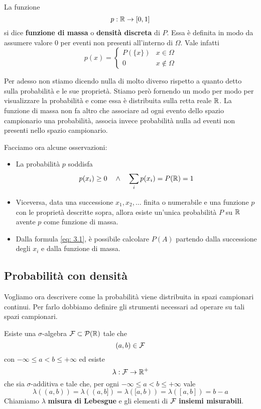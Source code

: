 \begin{definition}
	La funzione
	\[ p : \mathbb{R} \to [0,1] \]
	si dice \textbf{funzione di massa} o \textbf{densità discreta} di $P$. Essa è definita in modo
	da assumere valore 0 per eventi non presenti all'interno di $\Omega$. Vale infatti
	\[
		p(x) = \begin{cases}
			P(\{ x \}) & x \in \Omega    \\[1ex]
			0          & x \notin \Omega
		\end{cases}
	\]
\end{definition}

Per adesso non stiamo dicendo nulla di molto diverso rispetto a quanto detto sulla probabilità e
le sue proprietà. Stiamo però fornendo un modo per modo per visualizzare la probabilità e come
essa è distribuita sulla retta reale $\mathbb{R}$. La funzione di massa non fa altro che associare ad
ogni evento dello spazio campionario una probabilità, associa invece probabilità nulla ad eventi
non presenti nello spazio campionario.

\begin{observation}
	Facciamo ora alcune osservazioni:
	\begin{itemize}
		\item La probabilità $p$ soddisfa
		      \[ p(x_i) \geq 0 \quad \land \quad \sum_i p(x_i) = P(\mathbb{R}) = 1 \]
		\item Viceversa, data una successione $x_1, x_2, \dots$ finita o numerabile e una funzione
		      $p$ con le proprietà descritte sopra, allora esiste un'unica probabilità $P$ su $\mathbb{R}$
		      avente $p$ come funzione di massa.
		\item Dalla formula \ref{eq: 3.1}, è possibile calcolare $P(A)$ partendo dalla successione
		      degli $x_i$ e dalla funzione di massa.
	\end{itemize}
\end{observation}

\subsection{Probabilità con densità}
Vogliamo ora descrivere come la probabilità viene distribuita in spazi campionari continui. Per
farlo dobbiamo definire gli strumenti necessari ad operare su tali spazi campionari.

\begin{theorem}
	Esiste una $\sigma$-algebra $\mathcal{F} \subset \mathcal{P}(\mathbb{R})$ tale che
	\[ (a, b) \in \mathcal{F} \]
	con $-\infty \leq a < b \leq +\infty$ ed esiste
	\[ \lambda : \mathcal{F} \to \mathbb{R}^+ \]
	che sia $\sigma$-additiva e tale che, per ogni $-\infty \leq a < b \leq +\infty$ vale
	\[ \lambda((a,b)) = \lambda((a,b]) = \lambda ([a,b)) = \lambda([a,b]) = b - a \]
	Chiamiamo $\lambda$ \textbf{misura di Lebesgue} e gli elementi di $\mathcal{F}$
	\textbf{insiemi misurabili}.
\end{theorem}

